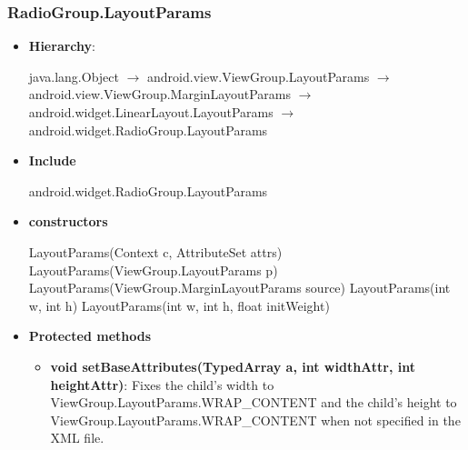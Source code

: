 \documentclass{report}
\begin{document}
    \subsubsection{RadioGroup.LayoutParams}
    \begin{itemize}
        \item \textbf{Hierarchy}: 
            \begin{center}
                java.lang.Object $\to$	android.view.ViewGroup.LayoutParams $\to$	android.view.ViewGroup.MarginLayoutParams $\to$	android.widget.LinearLayout.LayoutParams $\to$	android.widget.RadioGroup.LayoutParams
            \end{center}
        \item \textbf{Include}
            \bigbreak \noindent 
            \begin{javacode}
                android.widget.RadioGroup.LayoutParams
            \end{javacode}
        \item \textbf{constructors}
            \bigbreak \noindent 
            \begin{javacode}
                LayoutParams(Context c, AttributeSet attrs)
                LayoutParams(ViewGroup.LayoutParams p)
                LayoutParams(ViewGroup.MarginLayoutParams source)
                LayoutParams(int w, int h)
                LayoutParams(int w, int h, float initWeight)
            \end{javacode}
        \item \textbf{Protected methods}
            \begin{itemize}
                \item \textbf{void	setBaseAttributes(TypedArray a, int widthAttr, int heightAttr)}: Fixes the child's width to ViewGroup.LayoutParams.WRAP\_CONTENT and the child's height to ViewGroup.LayoutParams.WRAP\_CONTENT when not specified in the XML file.
            \end{itemize}
    \end{itemize}

    \pagebreak 
\end{document}
